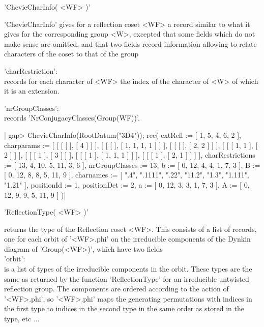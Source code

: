 
'ChevieCharInfo( <WF> )'

'ChevieCharInfo' gives for a reflection coset <WF> a record similar to what
it  gives for the corresponding group  <W>, excepted that some fields which
do  not  make  sense  are  omitted,  and that two fields record information
allowing to relate characters of the coset to that of the group\:

'charRestriction':\\ records for each character of <WF> the index of the
   character of <W> of which it is an extension.

'nrGroupClasses':\\ records 'NrConjugacyClasses(Group(WF))'.

|    gap> ChevieCharInfo(RootDatum("3D4"));
    rec(
      extRefl := [ 1, 5, 4, 6, 2 ],
      charparams := [ [ [ [  ], [ 4 ] ] ], [ [ [  ], [ 1, 1, 1, 1 ] ] ],
          [ [ [  ], [ 2, 2 ] ] ], [ [ [ 1, 1 ], [ 2 ] ] ],
          [ [ [ 1 ], [ 3 ] ] ], [ [ [ 1 ], [ 1, 1, 1 ] ] ],
          [ [ [ 1 ], [ 2, 1 ] ] ] ],
      charRestrictions := [ 13, 4, 10, 5, 11, 3, 6 ],
      nrGroupClasses := 13,
      b := [ 0, 12, 4, 4, 1, 7, 3 ],
      B := [ 0, 12, 8, 8, 5, 11, 9 ],
      charnames := [ ".4", ".1111", ".22", "11.2", "1.3", "1.111", "1.21"
         ],
      positionId := 1,
      positionDet := 2,
      a := [ 0, 12, 3, 3, 1, 7, 3 ],
      A := [ 0, 12, 9, 9, 5, 11, 9 ] )|


'ReflectionType( <WF> )'

returns  the type of the Reflection coset  <WF>. This consists of a list of
records,  one for each orbit of '<WF>.phi' on the irreducible components of
the Dynkin diagram of 'Group(<WF>)', which have two fields\:\\

'orbit':\\ is a list of types of the irreducible components in the orbit.
   These  types are the  same as returned  by the function 'ReflectionType'
   for  an  irreducible  untwisted  reflection  group.  The  components are
   ordered  according to the  action of '<WF>.phi',  so '<WF>.phi' maps the
   generating permutations with indices in the first type to indices in the
   second type in the same order as stored in the type, etc $\ldots$\\


